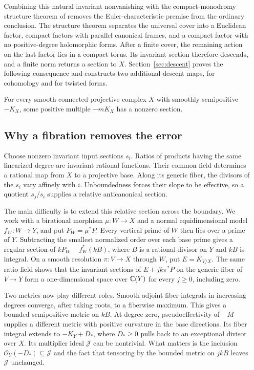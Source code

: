 Combining this natural invariant nonvanishing with the compact-monodromy structure theorem of \cite[Theorem \textnormal{(Finite cover with compact torus monodromy)}]{CompanionH} removes the Euler-characteristic premise from the ordinary conclusion. The structure theorem separates the universal cover into a Euclidean factor, compact factors with parallel canonical frames, and a compact factor with no positive-degree holomorphic forms. After a finite cover, the remaining action on the last factor lies in a compact torus. Its invariant section therefore descends, and a finite norm returns a section to $X$. Section~\ref{sec:descent} proves the following consequence and constructs two additional descent maps, for cohomology and for twisted forms.

\begin{corollary}\label{thm:ordinary}
For every smooth connected projective complex $X$ with smoothly semipositive $-K_X$, some positive multiple $-mK_X$ has a nonzero section.
\end{corollary}

\subsection{Why a fibration removes the error}
Choose nonzero invariant input sections $s_i$. Ratios of products having the same linearized degree are invariant rational functions. Their common field determines a rational map from $X$ to a projective base. Along its generic fiber, the divisors of the $s_i$ vary affinely with $i$. Unboundedness forces their slope to be effective, so a quotient $s_j/s_i$ supplies a relative anticanonical section.

The main difficulty is to extend this relative section across the boundary. We work with a birational morphism $\mu:W\to X$ and a normal equidimensional model $f_W:W\to Y$, and put $P_W=\mu^*P$. Every vertical prime of $W$ then lies over a prime of $Y$. Subtracting the smallest normalized order over each base prime gives a regular section of $kP_W-f_W^*(kB)$, where $B$ is a rational divisor on $Y$ and $kB$ is integral. On a smooth resolution $\pi:V\to X$ through $W$, put $E=K_{V/X}$. The same ratio field shows that the invariant sections of $E+jk\pi^*P$ on the generic fiber of $V\to Y$ form a one-dimensional space over $\mathbb C(Y)$ for every $j\ge0$, including zero.

Two metrics now play different roles. Smooth adjoint fiber integrals in increasing degrees converge, after taking roots, to a fiberwise maximum. This gives a bounded semipositive metric on $kB$. At degree zero, pseudoeffectivity of $-M$ supplies a different metric with positive curvature in the base directions. Its fiber integral extends to $-K_Y+D_*$, where $D_*\ge0$ pulls back to an exceptional divisor over $X$. Its multiplier ideal $\mathcal J$ can be nontrivial. What matters is the inclusion $\mathcal O_Y(-D_*)\subseteq\mathcal J$ and the fact that tensoring by the bounded metric on $jkB$ leaves $\mathcal J$ unchanged.

